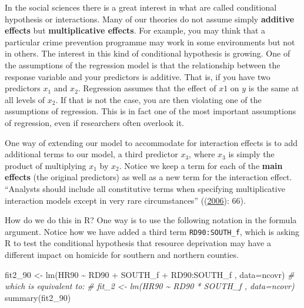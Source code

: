 \documentclass[
  krantz2]{krantz}
\makeatletter
\newenvironment{Shaded}{\begin{snugshade}}{\end{snugshade}}
\newcommand{\AttributeTok}[1]{\textcolor[rgb]{0.61,0.61,0.61}{#1}}
\newcommand{\CommentTok}[1]{\textcolor[rgb]{0.37,0.37,0.37}{\textit{#1}}}
\newcommand{\FunctionTok}[1]{\textcolor[rgb]{0,0,0}{#1}}
\newcommand{\NormalTok}[1]{#1}
\newcommand{\OtherTok}[1]{\textcolor[rgb]{0.37,0.37,0.37}{#1}}
\newcommand{\SpecialCharTok}[1]{\textcolor[rgb]{0,0,0}{#1}}
\newenvironment{kframe}{%
\medskip{}
\setlength{\fboxsep}{.8em}
 \def\at@end@of@kframe{}%
 \ifinner\ifhmode%
  \def\at@end@of@kframe{\end{minipage}}%
  \begin{minipage}{\columnwidth}%
 \fi\fi%
 \def\FrameCommand##1{\hskip\@totalleftmargin \hskip-\fboxsep
 \colorbox{shadecolor}{##1}\hskip-\fboxsep
     \hskip-\linewidth \hskip-\@totalleftmargin \hskip\columnwidth}%
 \MakeFramed {\advance\hsize-\width
   \@totalleftmargin\z@ \linewidth\hsize
   \@setminipage}}%
 {\par\unskip\endMakeFramed%
 \at@end@of@kframe}
\renewenvironment{Shaded}{\begin{kframe}}{\end{kframe}}
\makeatother
\begin{document}
In the social sciences there is a great interest in what are called conditional hypothesis or interactions. Many of our theories do not assume simply \textbf{additive effects} but \textbf{multiplicative effects}. For example, you may think that a particular crime prevention programme may work in some environments but not in others. The interest in this kind of conditional hypothesis is growing. One of the assumptions of the regression model is that the relationship between the response variable and your predictors is additive. That is, if you have two predictors \(x_1\) and \(x_2\). Regression assumes that the effect of \(x1\) on \(y\) is the same at all levels of \(x_2\). If that is not the case, you are then violating one of the assumptions of regression. This is in fact one of the most important assumptions of regression, even if researchers often overlook it.

One way of extending our model to accommodate for interaction effects is to add additional terms to our model, a third predictor \(x_3\), where \(x_3\) is simply the product of multiplying \(x_1\) by \(x_2\). Notice we keep a term for each of the \textbf{main effects} (the original predictors) as well as a new term for the interaction effect. ``Analysts should include all constitutive terms when specifying multiplicative interaction models except in very rare circumstances'' ((\protect\hyperlink{ref-Brambor_2006}{2006}): 66).

How do we do this in R? One way is to use the following notation in the formula argument. Notice how we have added a third term \texttt{RD90:SOUTH\_f}, which is asking R to test the conditional hypothesis that resource deprivation may have a different impact on homicide for southern and northern counties.

\begin{Shaded}
\begin{Highlighting}[]
\NormalTok{fit2\_90 }\OtherTok{\textless{}{-}} \FunctionTok{lm}\NormalTok{(HR90 }\SpecialCharTok{\textasciitilde{}}\NormalTok{ RD90 }\SpecialCharTok{+}\NormalTok{ SOUTH\_f }\SpecialCharTok{+}\NormalTok{ RD90}\SpecialCharTok{:}\NormalTok{SOUTH\_f , }\AttributeTok{data=}\NormalTok{ncovr)}
\CommentTok{\# which is equivalent to: }
\CommentTok{\# fit\_2 \textless{}{-} lm(HR90 \textasciitilde{} RD90 * SOUTH\_f , data=ncovr)}
\FunctionTok{summary}\NormalTok{(fit2\_90)}
\end{Highlighting}
\end{Shaded}
\end{document}
